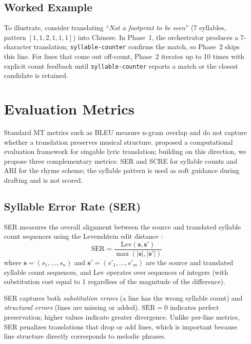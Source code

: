 \documentclass[11pt]{article}
\begin{document}
\subsection{Worked Example}

To illustrate, consider translating ``\emph{Not a footprint to be seen}'' (7 syllables, pattern $[1, 1, 2, 1, 1, 1]$) into Chinese.
In Phase~1, the orchestrator produces a 7-character translation; \texttt{syllable-counter} confirms the match, so Phase~2 skips this line.
For lines that come out off-count, Phase~2 iterates up to 10 times with explicit count feedback until \texttt{syllable-counter} reports a match or the closest candidate is retained.

\section{Evaluation Metrics}
\label{sec:eval}

Standard MT metrics such as BLEU measure n-gram overlap and do not capture whether a translation preserves musical structure.
\citet{kim-etal-2023-computational} proposed a computational evaluation framework for singable lyric translation; building on this direction, we propose three complementary metrics: SER and SCRE for syllable counts and ARI for the rhyme scheme; the syllable pattern is used as soft guidance during drafting and is not scored.

\subsection{Syllable Error Rate (SER)}

SER measures the overall alignment between the source and translated syllable count sequences using the Levenshtein edit distance \citep{levenshtein-1966}:
\begin{equation}
    \text{SER} = \frac{\text{Lev}(\mathbf{s}, \mathbf{s}')}{\max(|\mathbf{s}|, |\mathbf{s}'|)}
\end{equation}
where $\mathbf{s} = (s_1, \ldots, s_n)$ and $\mathbf{s}' = (s'_1, \ldots, s'_m)$ are the source and translated syllable count sequences, and $\text{Lev}$ operates over sequences of integers (with substitution cost equal to 1 regardless of the magnitude of the difference).

SER captures both \emph{substitution errors} (a line has the wrong syllable count) and \emph{structural errors} (lines are missing or added).
$\text{SER} = 0$ indicates perfect preservation; higher values indicate greater divergence.
Unlike per-line metrics, SER penalizes translations that drop or add lines, which is important because line structure directly corresponds to melodic phrases.
\end{document}

